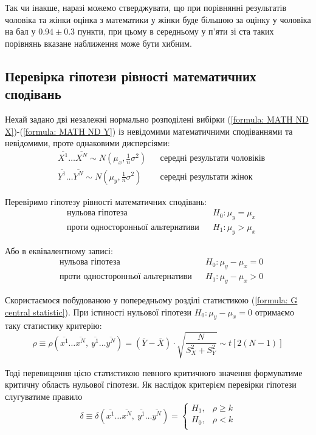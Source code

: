 Так чи інакше, наразі можемо стверджувати, що при порівнянні результатів чоловіка та жінки оцінка з 
математики у жінки буде більшою за оцінку у чоловіка на бал у $0.94\pm 0.3$ пункти, при цьому в середньому 
у п'яти зі ста таких порівнянь вказане наближення може бути хибним.

\subsection{Перевірка гіпотези рівності математичних сподівань}

Нехай задано дві незалежні нормально розподілені вибірки (\ref{formula: MATH ND X})-(\ref{formula: MATH ND Y}) 
із невідомими математичними сподіваннями та невідомими, проте однаковими дисперсіями: 
\begin{align*}
    &\overline{X^1}\ldots \overline{X^N}\sim N(\mu_x,\tfrac{1}{n}\sigma^2) && \text{середні результати чоловіків} \\
    &\overline{Y^1}\ldots \overline{Y^N}\sim N(\mu_y,\tfrac{1}{n}\sigma^2) && \text{середні результати жінок}
\end{align*}

Перевіримо гіпотезу рівності математичних сподівань:
\begin{align*}
    &\text{нульова гіпотеза} && H_0: \mu_y=\mu_x \\
    &\text{проти односторонньої альтернативи} && H_1: \mu_y>\mu_x 
\end{align*}

Або в еквівалентному записі:
\begin{align}
    &\text{нульова гіпотеза} && H_0: \mu_y-\mu_x=0 \label{formula: mathematical expectation equivalence hypothesis} \\
    &\text{проти односторонньої альтернативи} && H_1: \mu_y-\mu_x>0 \nonumber
\end{align}

Скористаємося побудованою у попередньому розділі статистикою (\ref{formula: G central statistic}). При істиності 
нульової гіпотези $H_0: \mu_y-\mu_x=0$ отримаємо таку статистику критерію:
\begin{equation}
    \rho\equiv\rho(\overline{ x^1}\ldots \overline{x^N},\ \overline{y^1}\ldots \overline{y^N})=
    (\overline{Y}-\overline{X}) \cdot \sqrt{\frac{N}{S_X^2+S_Y^2}}
    \sim t\left[ 2(N-1) \right] \label{formula: mathematical expectation equivalence statistic}
\end{equation}

Тоді перевищення цією статистикою певного критичного значення формуватиме критичну область нульової 
гіпотези. Як наслідок критерієм перевірки гіпотези слугуватиме правило
\begin{equation}
    \delta\equiv\delta(\overline{ x^1}\ldots \overline{x^N},\ \overline{y^1}\ldots \overline{y^N})=
    \begin{cases}
        H_1, & \rho\geqslant k \\
        H_0, & \rho < k \\
    \end{cases} \label{formula: mathematical expectation equivalence criterion}
\end{equation}

